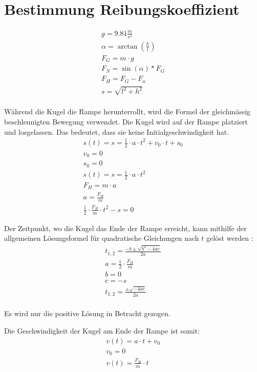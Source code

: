 \section{Bestimmung Reibungskoeffizient}

\begin{align}
    g = 9.81 \frac{m}{s^2}\\
    \alpha = \arctan(\frac{h}{l})\\
    F_G = m \cdot g\\
    F_N = \sin(\alpha) * F_G\\
    F_H = F_G - F_n\\
    s = \sqrt{l^2 + h^2}\\
\end{align}

Während die Kugel die Rampe herunterrollt, wird die Formel der gleichmässig beschleunigten Bewegung verwendet.
Die Kugel wird auf der Rampe platziert und losgelassen. Das bedeutet, dass sie keine Initialgeschwindigkeit hat.
\begin{align}
    s(t) = s = \frac{1}{2} \cdot a \cdot t^2 + v_0 \cdot t + s_0\\
    v_0 = 0\\
    s_0 = 0\\
    s(t) = s = \frac{1}{2} \cdot a \cdot t^2\\
    F_H = m \cdot a\\
    a = \frac{F_H}{m}\\
    \frac{1}{2} \cdot \frac{F_H}{m} \cdot t^2 - s = 0
\end{align}

Der Zeitpunkt, wo die Kugel das Ende der Rampe erreicht, kann mithilfe der allgemeinen Lösungsformel für quadratische Gleichungen nach $t$ gelöst werden \cite{wiki.mitternachtsformel:1}:
\begin{align}
    t_{1,2} = \frac{-b \pm \sqrt{b^2 - 4ac}}{2a}\\
    a = \frac{1}{2} \cdot \frac{F_H}{m}\\
    b = 0\\
    c = -s\\
    t_{1,2} = \frac{\pm \sqrt{-4ac}}{2a}\\
\end{align}

Es wird nur die positive Lösung in Betracht gezogen.

Die Geschwindigkeit der Kugel am Ende der Rampe ist somit:
\begin{align}
    v(t) = a \cdot t + v_0\\
    v_0 = 0\\
    v(t) = \frac{F_H}{m} \cdot t
\end{align}

